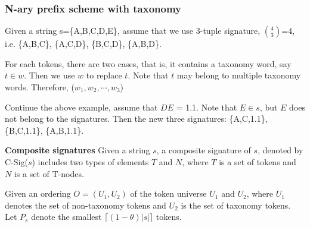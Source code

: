\subsubsection{N-ary prefix scheme with taxonomy}

 Given a string s=\{A,B,C,D,E\}, assume that we use 3-tuple signature, $\binom{4}{3}$=4, i.e. \{A,B,C\}, \{A,C,D\}, \{B,C,D\}, \{A,B,D\}.

For each tokens, there are two cases, that is, it contains a taxonomy word, say $t \in w$. Then we use $w$ to replace $t$. Note that $t$ may belong to multiple taxonomy words. Therefore, ($w_1, w_2, \cdots, w_3$)

Continue the above example, assume that $DE$ = 1.1. Note that $E \in s $, but $E$ does not belong to the signatures. Then the new three signatures:  \{A,C,1.1\}, \{B,C,1.1\}, \{A,B,1.1\}.

\noindent \textbf{Composite signatures} Given a string $s$, a composite signature of $s$, denoted by C-Sig($s$) includes two types of elements $T$ and $N$, where $T$ is a set of tokens and $N$ is a set of T-nodes.

Given an
ordering $O = (U_1 , U_2 )$ of the token universe $U_1$ and $U_2$, where $U_1$ denotes the set of non-taxonomy tokens and $U_2$ is the set of taxonomy tokens. Let $P_s$ denote the smallest $\lceil(1-\theta)|s|\rceil$ tokens.

%
%
%


%
%

